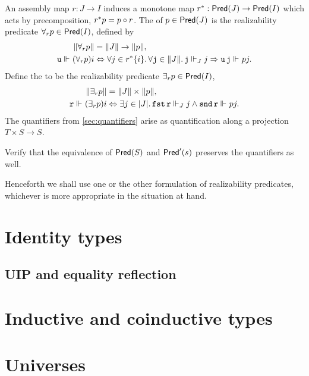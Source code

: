 An assembly map $r : J \to I$ induces a monotone map $\invim{r} : \Pred{J} \to \Pred{I}$ which acts by precomposition, $\invim{r} p = p \circ r$. The  of $p \in \Pred{J}$  is the realizability predicate $\forall_r p \in \Pred{I}$, defined by
%
\begin{align*}
  \T{\forall_r p} &= \T{J} \to \T{p}, \\
  \R{u} \rz (\forall_r p) i &\liff
    \all{j \in \invim{r} \set{i}}
    \all{\R{j} \in \T{J}}
    \R{j} \rz[J] j \lthen \R{u}\,\R{j} \rz p j.
\end{align*}
%
Define the  to be the realizability predicate $\exists_r p \in \Pred{I}$,
%
\begin{align*}
  \T{\exists_r p} &= \T{J} \times \T{p}, \\
  \R{r} \rz (\exists_r p) i &\liff
  \some{j \in \S{J}}
   \combFst\,\R{r} \rz[J] j
   \land
   \combSnd\,\R{r} \rz p j.
\end{align*}
%
The quantifiers from \cref{sec:quantifiers} arise as quantification along a projection $T \times S \to S$.

\begin{exercise}
  Verify that the equivalence of $\Pred{S}$ and $\PredT{s}$ preserves the quantifiers as well.
\end{exercise}

Henceforth we shall use one or the other formulation of realizability predicates, whichever is more appropriate in the situation at hand.


\section{Identity types}
\label{sec:identity-types}



\subsection{UIP and equality reflection}
\label{sec:uip-equal-refl}

\section{Inductive and coinductive types}
\label{sec:inductive-counductive-types}

\section{Universes}
\label{sec:universes}

